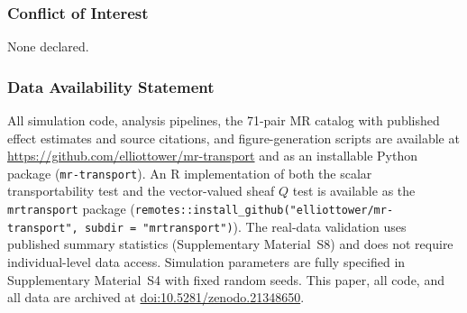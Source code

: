 \documentclass[11pt]{article}
\begin{document}
\subsubsection*{Conflict of Interest}
None declared.

\subsubsection*{Data Availability Statement}
All simulation code, analysis pipelines, the 71-pair MR catalog with published effect estimates and source citations, and figure-generation scripts are available at \url{https://github.com/elliottower/mr-transport} and as an installable Python package (\texttt{mr-transport}). An R implementation of both the scalar transportability test and the vector-valued sheaf $Q$ test is available as the \texttt{mrtransport} package (\texttt{remotes::install\_github("elliottower/mr-transport", subdir = "mrtransport")}). The real-data validation uses published summary statistics (Supplementary Material~S8) and does not require individual-level data access. Simulation parameters are fully specified in Supplementary Material~S4 with fixed random seeds. This paper, all code, and all data are archived at \href{https://doi.org/10.5281/zenodo.21348650}{doi:10.5281/zenodo.21348650}.



\end{document}
